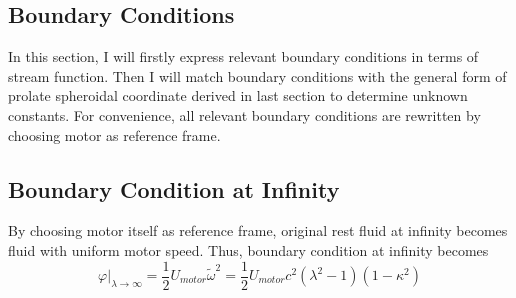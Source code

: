 \documentclass[fontsize=11pt, %
                             paper=a4, %
                             twoside, %
                             captions=tableheading,
                             index=totoc,
                             hyperref]{labbook}
\begin{document}
\begin{addmargin}[4cm]{0cm}
\section{Boundary Conditions}
In this section, I will firstly express relevant boundary conditions in terms of stream function. Then I will match boundary conditions with the general form of prolate spheroidal coordinate derived in last section to determine unknown constants. For convenience, all  relevant boundary conditions are rewritten by choosing motor as reference frame.
\subsection{Boundary Condition at Infinity}
By choosing motor itself as reference frame, original rest fluid at infinity becomes fluid with uniform motor speed. Thus, boundary condition at infinity becomes
\begin{equation}
\varphi|_{\lambda\rightarrow\infty}=\frac{1}{2}U_{motor}\tilde{\omega}^2=\frac{1}{2}U_{motor}c^2(\lambda^2-1)(1-\kappa^2)
\end{equation}

\end{addmargin}
\end{document}
